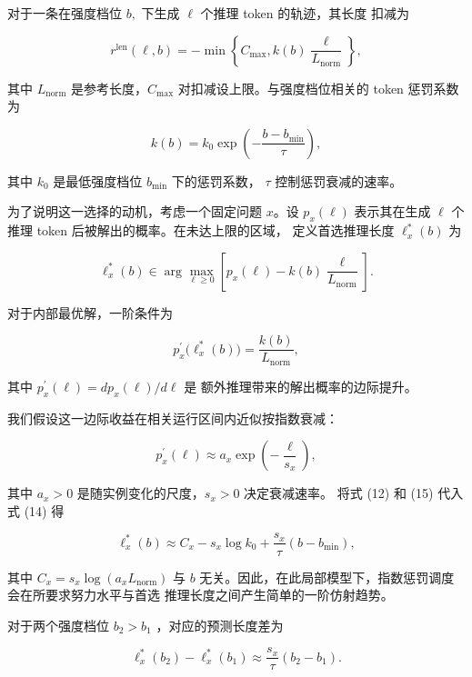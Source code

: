 对于一条在强度档位 \(b ,\) 下生成 \(\ell\) 个推理 token 的轨迹，其长度
扣减为

\[
r ^ { \mathrm { l e n } } ( \ell , b ) = - \operatorname* { m i n } \left\{ C _ { \mathrm { m a x } } , k ( b ) \frac { \ell } { L _ { \mathrm { n o r m } } } \right\} ,\tag{11}
\]

其中 \(L _ { \mathrm { n o r m } }\) 是参考长度，\(C _ { \mathrm { m a x } }\)
对扣减设上限。与强度档位相关的 token 惩罚系数为

\[
k ( b ) = k _ { 0 } \exp \left( - \frac { b - b _ { \mathrm { m i n } } } { \tau } \right) ,\tag{12}
\]

其中 \(k _ { 0 }\) 是最低强度档位 \(b _ { \mathrm { min } }\) 下的惩罚系数，
\(\tau\) 控制惩罚衰减的速率。

为了说明这一选择的动机，考虑一个固定问题 $x$。设 \(p _ { x } ( \ell )\)
表示其在生成 $\ell$ 个推理 token 后被解出的概率。在未达上限的区域，
定义首选推理长度 $\ell_x^*(b)$ 为

\[
\ell _ { x } ^ { * } ( b ) \in \arg \operatorname* { m a x } _ { \ell \geqslant 0 } \left[ p _ { x } ( \ell ) - k ( b ) \frac { \ell } { L _ { \mathrm { n o r m } } } \right] .\tag{13}
\]

对于内部最优解，一阶条件为

\[
p _ { x } ^ { \prime } \big ( \ell _ { x } ^ { * } ( b ) \big ) = \frac { k ( b ) } { L _ { \mathrm { n o r m } } } ,\tag{14}
\]

其中
\(p _ { x } ^ { \prime } ( \ell ) = d p _ { x } ( \ell ) / d \ell\) 是
额外推理带来的解出概率的边际提升。

我们假设这一边际收益在相关运行区间内近似按指数衰减：

\[
p _ { x } ^ { \prime } ( \ell ) \approx a _ { x } \exp \left( - \frac { \ell } { s _ { x } } \right) ,\tag{15}
\]

其中 \(a _ { x } > 0\) 是随实例变化的尺度，\(s _ { x } > 0\) 决定衰减速率。
将式 (12) 和 (15) 代入式 (14) 得

\[
\ell _ { x } ^ { \ast } ( b ) \approx C _ { x } - s _ { x } \log k _ { 0 } + \frac { s _ { x } } { \tau } ( b - b _ { \mathrm { m i n } } ) ,\tag{16}
\]

其中
\(C _ { x } = s _ { x } \log ( a _ { x } L _ { \mathrm { n o r m } } )\)
与 $b$ 无关。因此，在此局部模型下，指数惩罚调度会在所要求努力水平与首选
推理长度之间产生简单的一阶仿射趋势。

对于两个强度档位 \(b _ { 2 } > b _ { 1 }\) ，对应的预测长度差为

\[
\ell _ { x } ^ { \ast } ( b _ { 2 } ) - \ell _ { x } ^ { \ast } ( b _ { 1 } ) \approx \frac { s _ { x } } { \tau } ( b _ { 2 } - b _ { 1 } ) .\tag{17}
\]

